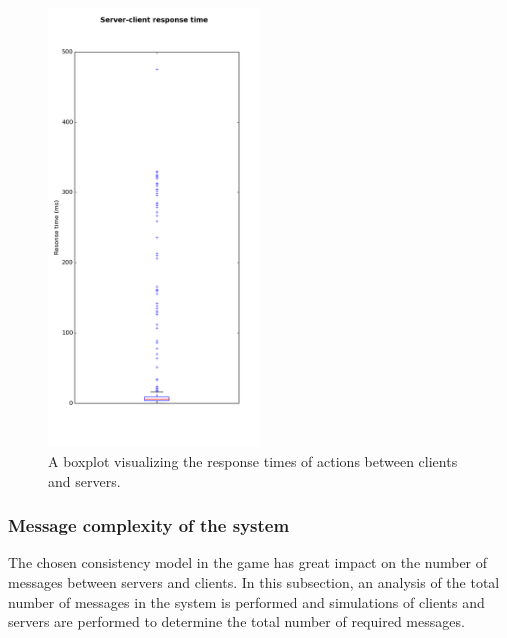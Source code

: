 		\begin{figure}[h!]
		  \centering
		    \includegraphics[width=0.5\textwidth, height=0.59\textheight]{images/boxplot_response_times}
		    
		  \caption{A boxplot visualizing the response times of actions between clients and servers.}
		  \label{fig:boxplot_response_times}
		\end{figure}
		
	\subsubsection{Message complexity of the system}
	\label{subsubsec:nummessages}
		The chosen consistency model in the game has great impact on the number of messages between servers and clients. 
		In this subsection, an analysis of the total number of messages in the system is performed and simulations of clients and servers are performed to determine the total number of required messages.\\
		
